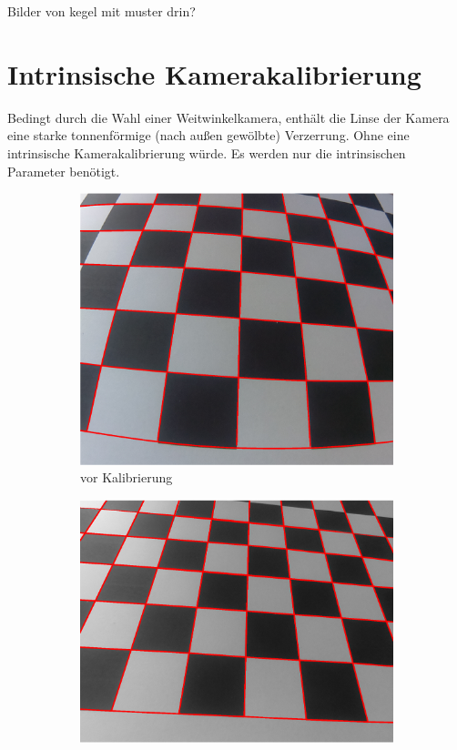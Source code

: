

Bilder von kegel mit muster drin?

\section{Intrinsische Kamerakalibrierung}

Bedingt durch die Wahl einer Weitwinkelkamera, enthält die Linse der Kamera eine starke tonnenförmige (nach außen gewölbte) Verzerrung. Ohne eine intrinsische Kamerakalibrierung würde. Es werden nur die intrinsischen Parameter benötigt.


\begin{figure}[!htb]
	\centering
\begin{subfigure}{.5\textwidth}
	\centering
	\includegraphics[scale=.35]{images/calibrationRaspi.eps}
	\caption{vor Kalibrierung}
	\label{fig:calibDist}
\end{subfigure}%
\begin{subfigure}{.5\textwidth}
	\centering
	\includegraphics[scale=.4]{images/calibrationRaspi2.eps}

\end{subfigure}
\end{figure}
